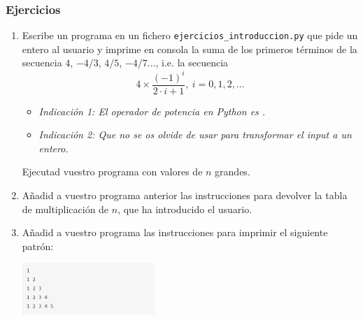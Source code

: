 \documentclass[handout,9pt]{beamer}
\begin{document}
\begin{frame}[fragile]
  \frametitle{Ejercicios}
  \begin{enumerate}
    \item Escribe un programa en un fichero {\tt ejercicios\_introduccion.py} que
      pide un entero  al usuario y imprime en consola la suma
      de los primeros   términos de la secuencia $4$, $-4/3$, $4/5$, $-4/7
      \ldots$, i.e. la secuencia
      $$ 4\times \frac{(-1)^{i}}{2\cdot i + 1},\ i = 0, 1, 2, \ldots$$
      \begin{itemize}
      \item \textit{Indicación 1: El operador de potencia en Python es
          \pyv{**}.}
      \item \textit{Indicación 2: Que no se os olvide de usar
           para transformar el input a un entero.}
      \end{itemize}
      Ejecutad vuestro programa con valores de $n$ grandes.
    \item Añadid a vuestro programa anterior
            las instrucciones para devolver la tabla de multiplicación
      de $n$, que ha introducido el usuario.
    \item Añadid a vuestro programa las instrucciones para imprimir el siguiente patrón:
      \begin{center}
        \includegraphics[width=5cm]{../figures/for_exercises_01}
      \end{center}
    \end{enumerate}  
  \end{frame}
\end{document}
